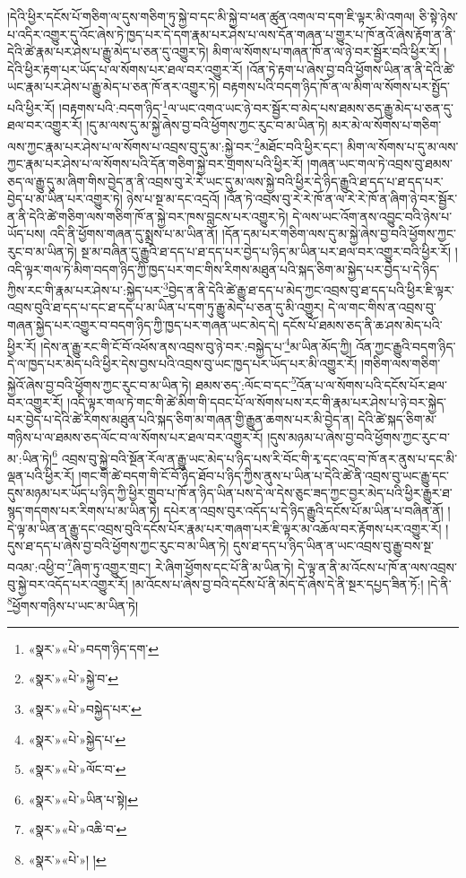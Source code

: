 །དེའི་ཕྱིར་དངོས་པོ་གཅིག་ལ་དུས་གཅིག་ཏུ་སྐྱེ་བ་དང་མི་སྐྱེ་བ་ཕན་ཚུན་འགལ་བ་དག་ཇི་ལྟར་མི་འགལ། ཅི་སྟེ་ཉེས་པ་འདིར་འགྱུར་དུ་འོང་ཞེས་ཏེ་ཁྱད་པར་དེ་དག་རྣམ་པར་ཤེས་པ་ལས་དོན་གཞན་པ་གྱུར་པ་ཁོ་ནའོ་ཞེས་རྟོག་ན་ནི་དེའི་ཚེ་རྣམ་པར་ཤེས་པ་རྒྱུ་མེད་པ་ཅན་དུ་འགྱུར་ཏེ། མིག་ལ་སོགས་པ་གཞན་ཁོ་ན་ལ་ཉེ་བར་སྦྱོར་བའི་ཕྱིར་རོ། །དེའི་ཕྱིར་རྟག་པར་ཡོད་པ་ལ་སོགས་པར་ཐལ་བར་འགྱུར་རོ། །འོན་ཏེ་རྟག་པ་ཞེས་བྱ་བའི་ཕྱོགས་ཡིན་ན་ནི་དེའི་ཚེ་ཡང་རྣམ་པར་ཤེས་པ་རྒྱུ་མེད་པ་ཅན་ཁོ་ནར་འགྱུར་ཏེ། བརྟགས་པའི་བདག་ཉིད་ཁོ་ན་ལ་མིག་ལ་སོགས་པར་སྤྱོད་པའི་ཕྱིར་རོ། །བརྟགས་པའི་:བདག་ཉིད་\footnote{«སྣར་»«པེ་»བདག་ཉིད་དག་}ལ་ཡང་འགའ་ཡང་ཉེ་བར་སྦྱོར་བ་མེད་པས་ཐམས་ཅད་རྒྱུ་མེད་པ་ཅན་དུ་ཐལ་བར་འགྱུར་རོ། །དུ་མ་ལས་དུ་མ་སྐྱེ་ཞེས་བྱ་བའི་ཕྱོགས་ཀྱང་རུང་བ་མ་ཡིན་ཏེ། མར་མེ་ལ་སོགས་པ་གཅིག་ལས་ཀྱང་རྣམ་པར་ཤེས་པ་ལ་སོགས་པ་འབྲས་བུ་དུ་མ་:སྐྱེ་བར་\footnote{«སྣར་»«པེ་»སྐྱེ་བ་}མཐོང་བའི་ཕྱིར་དང་། མིག་ལ་སོགས་པ་དུ་མ་ལས་ཀྱང་རྣམ་པར་ཤེས་པ་ལ་སོགས་པའི་དོན་གཅིག་སྐྱེ་བར་གྲགས་པའི་ཕྱིར་རོ། །གཞན་ཡང་གལ་ཏེ་འབྲས་བུ་ཐམས་ཅད་ལ་རྒྱུ་དུ་མ་ཞིག་གིས་བྱེད་ན་ནི་འབྲས་བུ་རེ་རེ་ཡང་དུ་མ་ལས་སྐྱེ་བའི་ཕྱིར་དེ་ཉིད་རྒྱུའི་ཐ་དད་པ་ཐ་དད་པར་བྱེད་པ་མ་ཡིན་པར་འགྱུར་ཏེ། ཉེས་པ་སྔ་མ་དང་འདྲའོ། །འོན་ཏེ་འབྲས་བུ་རེ་རེ་ཁོ་ན་ལ་རེ་རེ་ཁོ་ན་ཞིག་ཉེ་བར་སྦྱོར་ན་ནི་དེའི་ཚེ་གཅིག་ལས་གཅིག་ཁོ་ན་སྐྱེ་བར་ཁས་བླངས་པར་འགྱུར་ཏེ། དེ་ལས་ཡང་འོག་ནས་འབྱུང་བའི་ཉེས་པ་ཡོད་པས། འདི་ནི་ཕྱོགས་གཞན་དུ་སྨྲས་པ་མ་ཡིན་ནོ། །དོན་དམ་པར་གཅིག་ལས་དུ་མ་སྐྱེ་ཞེས་བྱ་བའི་ཕྱོགས་ཀྱང་རུང་བ་མ་ཡིན་ཏེ། སྔ་མ་བཞིན་དུ་རྒྱུའི་ཐ་དད་པ་ཐ་དད་པར་བྱེད་པ་ཉིད་མ་ཡིན་པར་ཐལ་བར་འགྱུར་བའི་ཕྱིར་རོ། །འདི་ལྟར་གལ་ཏེ་མིག་བདག་ཉིད་ཀྱི་ཁྱད་པར་གང་གིས་རིགས་མཐུན་པའི་སྐད་ཅིག་མ་སྐྱེད་པར་བྱེད་པ་དེ་ཉིད་ཀྱིས་རང་གི་རྣམ་པར་ཤེས་པ་:སྐྱེད་པར་\footnote{«སྣར་»«པེ་»བསྐྱེད་པར་}བྱེད་ན་ནི་དེའི་ཚེ་རྒྱུ་ཐ་དད་པ་མེད་ཀྱང་འབྲས་བུ་ཐ་དད་པའི་ཕྱིར་ཇི་ལྟར་འབྲས་བུའི་ཐ་དད་པ་དང་ཐ་དད་པ་མ་ཡིན་པ་དག་ཏུ་རྒྱུ་མེད་པ་ཅན་དུ་མི་འགྱུར། དེ་ལ་གང་གིས་ན་འབྲས་བུ་གཞན་སྐྱེད་པར་འགྱུར་བ་བདག་ཉིད་ཀྱི་ཁྱད་པར་གཞན་ཡང་མེད་དེ། དངོས་པོ་ཐམས་ཅད་ནི་ཆ་ཤས་མེད་པའི་ཕྱིར་རོ། །དེས་ན་རྒྱུ་རང་གི་ངོ་བོ་འཕོས་ནས་འབྲས་བུ་ཉེ་བར་:བསྐྱེད་པ་\footnote{«སྣར་»«པེ་»སྐྱེད་པ་}མ་ཡིན་མོད་ཀྱི། འོན་ཀྱང་རྒྱུའི་བདག་ཉིད་དེ་ལ་ཁྱད་པར་མེད་པའི་ཕྱིར་དེས་བྱས་པའི་འབྲས་བུ་ཡང་ཁྱད་པར་ཡོད་པར་མི་འགྱུར་རོ། །གཅིག་ལས་གཅིག་སྐྱེའོ་ཞེས་བྱ་བའི་ཕྱོགས་ཀྱང་རུང་བ་མ་ཡིན་ཏེ། ཐམས་ཅད་:ལོང་བ་དང་\footnote{«སྣར་»«པེ་»ལོང་བ་}འོན་པ་ལ་སོགས་པའི་དངོས་པོར་ཐལ་བར་འགྱུར་རོ། །འདི་ལྟར་གལ་ཏེ་གང་གི་ཚེ་མིག་གི་དབང་པོ་ལ་སོགས་པས་རང་གི་རྣམ་པར་ཤེས་པ་ཉེ་བར་སྐྱེད་པར་བྱེད་པ་དེའི་ཚེ་རིགས་མཐུན་པའི་སྐད་ཅིག་མ་གཞན་གྱི་རྒྱུན་ཆགས་པར་མི་བྱེད་ན། དེའི་ཚེ་སྐད་ཅིག་མ་གཉིས་པ་ལ་ཐམས་ཅད་ལོང་བ་ལ་སོགས་པར་ཐལ་བར་འགྱུར་རོ། །དུས་མཉམ་པ་ཞེས་བྱ་བའི་ཕྱོགས་ཀྱང་རུང་བ་མ་:ཡིན་ཏེ།\footnote{«སྣར་»«པེ་»ཡིན་པ་སྟེ།} འབྲས་བུ་སྐྱེ་བའི་སྔོན་རོལ་ན་རྒྱུ་ཡང་མེད་པ་ཉིད་པས་རི་བོང་གི་རྭ་དང་འདྲ་བ་ཁོ་ནར་ནུས་པ་དང་མི་ལྡན་པའི་ཕྱིར་རོ། །གང་གི་ཚེ་བདག་གི་ངོ་བོ་ཉིད་ཐོབ་པ་ཉིད་ཀྱིས་ནུས་པ་ཡིན་པ་དེའི་ཚེ་ནི་འབྲས་བུ་ཡང་རྒྱུ་དང་དུས་མཉམ་པར་ཡོད་པ་ཉིད་ཀྱི་ཕྱིར་གྲུབ་པ་ཁོ་ན་ཉིད་ཡིན་པས་དེ་ལ་དེས་ཅུང་ཟད་ཀྱང་བྱར་མེད་པའི་ཕྱིར་རྒྱུར་ཐ་སྙད་གདགས་པར་རིགས་པ་མ་ཡིན་ཏེ། དཔེར་ན་འབྲས་བུར་འདོད་པ་དེ་ཉིད་རྒྱུའི་དངོས་པོ་མ་ཡིན་པ་བཞིན་ནོ། །དེ་ལྟ་མ་ཡིན་ན་རྒྱུ་དང་འབྲས་བུའི་དངོས་པོར་རྣམ་པར་གཞག་པར་ཇི་ལྟར་མ་འཆོལ་བར་རྟོགས་པར་འགྱུར་རོ། །དུས་ཐ་དད་པ་ཞེས་བྱ་བའི་ཕྱོགས་ཀྱང་རུང་བ་མ་ཡིན་ཏེ། དུས་ཐ་དད་པ་ཉིད་ཡིན་ན་ཡང་འབྲས་བུ་རྒྱུ་བས་སྔ་བའམ་:འཕྱི་བ་\footnote{«སྣར་»«པེ་»འཆི་བ་}ཞིག་ཏུ་འགྱུར་གྲང་། རེ་ཞིག་ཕྱོགས་དང་པོ་ནི་མ་ཡིན་ཏེ། དེ་ལྟ་ན་ནི་མ་འོངས་པ་ཁོ་ན་ལས་འབྲས་བུ་སྐྱེ་བར་འདོད་པར་འགྱུར་རོ། །མ་འོངས་པ་ཞེས་བྱ་བའི་དངོས་པོ་ནི་མེད་དོ་ཞེས་དེ་ནི་སྔར་དཔྱད་ཟིན་ཏོ:། །དེ་ནི་\footnote{«སྣར་»«པེ་»། །}ཕྱོགས་གཉིས་པ་ཡང་མ་ཡིན་ཏེ། 
